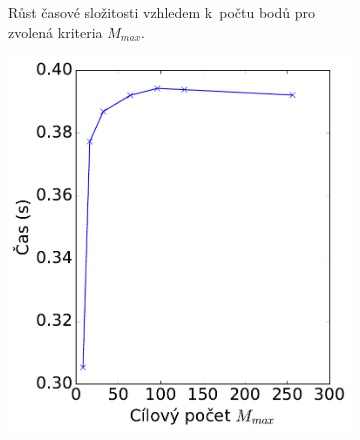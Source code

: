 \begin{figure}
\begin{subfigure}[t]{0.29\columnwidth}
    \caption{Růst časové složitosti vzhledem k~počtu bodů pro zvolená kriteria $M_{max}$. }
            \label{fig:benchmark_builtime_points_Mmax_all}
\end{subfigure}
\hfill
\begin{subfigure}[t]{0.29\columnwidth}
    \centering  
    \includegraphics[scale=0.4]{obrazky-figures/benchmark/benchmark_builtime_points_lowest.pdf}


\end{subfigure}
\end{figure}
